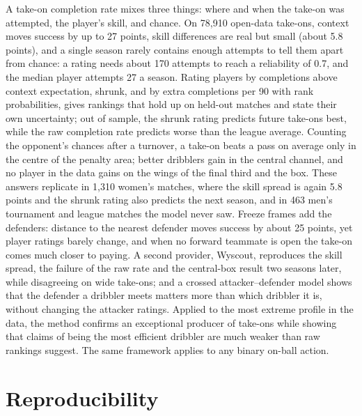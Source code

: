 \documentclass[
  12pt]{article}
\begin{document}
A take-on completion rate mixes three things: where and when the take-on
was attempted, the player's skill, and chance. On 78,910 open-data
take-ons, context moves success by up to 27 points, skill differences
are real but small (about 5.8 points), and a single season rarely
contains enough attempts to tell them apart from chance: a rating needs
about 170 attempts to reach a reliability of 0.7, and the median player
attempts 27 a season. Rating players by completions above context
expectation, shrunk, and by extra completions per 90 with rank
probabilities, gives rankings that hold up on held-out matches and state
their own uncertainty; out of sample, the shrunk rating predicts future
take-ons best, while the raw completion rate predicts worse than the
league average. Counting the opponent's chances after a turnover, a
take-on beats a pass on average only in the centre of the penalty area;
better dribblers gain in the central channel, and no player in the data
gains on the wings of the final third and the box. These answers
replicate in 1,310 women's matches, where the skill spread is again 5.8
points and the shrunk rating also predicts the next season, and in 463
men's tournament and league matches the model never saw. Freeze frames
add the defenders: distance to the nearest defender moves success by
about 25 points, yet player ratings barely change, and when no forward
teammate is open the take-on comes much closer to paying. A second
provider, Wyscout, reproduces the skill spread, the failure of the raw
rate and the central-box result two seasons later, while disagreeing on
wide take-ons; and a crossed attacker--defender model shows that the
defender a dribbler meets matters more than which dribbler it is,
without changing the attacker ratings. Applied to the most extreme
profile in the data, the method confirms an exceptional producer of
take-ons while showing that claims of being the most efficient dribbler
are much weaker than raw rankings suggest. The same framework applies to
any binary on-ball action.

\section*{Reproducibility}\label{sec-repro}
\end{document}
